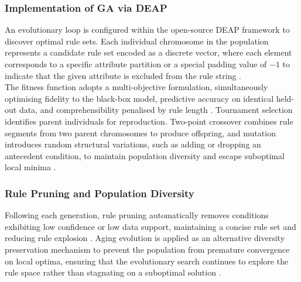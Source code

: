 \subsubsection{Implementation of GA via DEAP}
\label{ssub:method_ga_deap}
An evolutionary loop is configured within the open-source DEAP framework to 
discover optimal rule sets. Each individual chromosome in the population 
represents a candidate rule set encoded as a discrete vector, where each element 
corresponds to a specific attribute partition or a special padding value of $-1$ 
to indicate that the given attribute is excluded from the rule string 
\cite{Yedjour2024}. 
\\
The fitness function adopts a multi-objective formulation, simultaneously 
optimising fidelity to the black-box model, predictive accuracy on identical 
held-out data, and comprehensibility penalised by rule length \cite{Yedjour2024}. 
Tournament selection identifies parent individuals for reproduction. Two-point 
crossover combines rule segments from two parent chromosomes to produce 
offspring, and mutation introduces random structural variations, such as adding 
or dropping an antecedent condition, to maintain population diversity and escape 
suboptimal local minima \cite{Yedjour2024}.

\subsubsection{Rule Pruning and Population Diversity}
\label{ssub:method_ga_pruning}
Following each generation, rule pruning automatically removes conditions exhibiting 
low confidence or low data support, maintaining a concise rule set and reducing 
rule explosion \cite{Yedjour2024}. Aging evolution is applied as an alternative 
diversity preservation mechanism to prevent the population from premature 
convergence on local optima, ensuring that the evolutionary search continues to 
explore the rule space rather than stagnating on a suboptimal solution 
\cite{Yedjour2024}.

